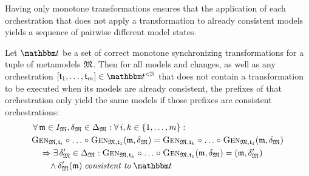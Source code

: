 Having only monotone transformations ensures that the application of each orchestration that does not apply a transformation to already consistent models yields a sequence of pairwise different model states.
\begin{lemma}
    \label{lemma:monotonetransformationsnosamestates}
    Let $\transformationset{T}$ be a set of correct monotone synchronizing transformations for a tuple of metamodels $\metamodeltuple{M}$.
    Then for all models and changes, as well as any orchestration $\sequenced{\transformation{t}_{1}, \dots, \transformation{t}_{m}} \in \transformationset{T}^{< \mathbb{N}}$ that does not contain a transformation to be executed when its models are already consistent, the prefixes of that orchestration only yield the same models if those prefixes are consistent orchestrations:
    \begin{align*}
        &
        \forall \modeltuple{m} \in \metamodeltupleinstanceset{M}, \changetuple{\metamodeltuple{M}} \in \changeuniverse{\metamodeltuple{M}} : \forall i, k \in \setted{1, \dots, m} : \\
        &
        \generalizationfunction{\metamodeltuple{M}, \transformation{t}_{i}} \concatfunction \dots \concatfunction \generalizationfunction{\metamodeltuple{M}, \transformation{t}_{1}}(\modeltuple{m}, \changetuple{\metamodeltuple{M}}) = \generalizationfunction{\metamodeltuple{M}, \transformation{t}_{k}} \concatfunction \dots \concatfunction \generalizationfunction{\metamodeltuple{M}, \transformation{t}_{1}}(\modeltuple{m}, \changetuple{\metamodeltuple{M}}) \\
        & \formulaskip 
        \Rightarrow
        \exists \changetuple{\metamodeltuple{M}}' \in \changeuniverse{\metamodeltuple{M}} :
        \generalizationfunction{\metamodeltuple{M}, \transformation{t}_{k}} \concatfunction \dots \concatfunction \generalizationfunction{\metamodeltuple{M}, \transformation{t}_{1}}(\modeltuple{m}, \changetuple{\metamodeltuple{M}}) = (\modeltuple{m}, \changetuple{\metamodeltuple{M}}') \\
        & \formulaskip\formulaskip
        \land 
        \changetuple{\metamodeltuple{M}}'(\modeltuple{m}) \consistenttomath \transformationset{T}
        \end{align*}
\end{lemma}
